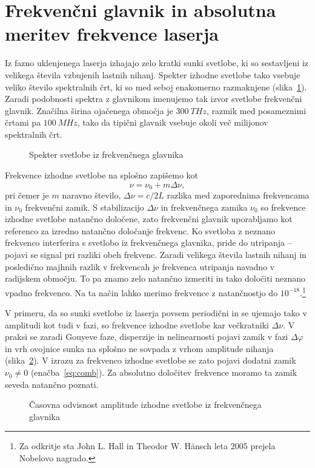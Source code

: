 \section{Frekvenčni glavnik in absolutna meritev frekvence laserja}
Iz fazno uklenjenega laserja izhajajo zelo kratki sunki svetlobe, ki 
so sestavljeni iz velikega števila vzbujenih lastnih nihanj. Spekter 
izhodne svetlobe tako vsebuje veliko število spektralnih črt, ki
so med seboj enakomerno razmaknjene (slika~\ref{fig:comb}). Zaradi podobnosti spektra
z glavnikom imenujemo tak izvor svetlobe frekvenčni glavnik. Značilna širina ojačenega
območja je $300~\si{THz}$, razmik med posameznimi črtami pa $100~\si{MHz}$, tako 
da tipični glavnik vsebuje okoli več milijonov spektralnih črt.
\begin{figure}[h]
\centering
\def\svgwidth{110truemm} 

\caption{Spekter svetlobe iz frekvenčnega glavnika}
\label{fig:comb}
\end{figure}

Frekvence izhodne svetlobe na splošno zapišemo kot 
\begin{equation}
\nu = \nu_0 + m\Delta \nu,
\label{eq:comb}
\end{equation}
pri čemer je $m$ naravno število, $\Delta \nu = c/2L$ razlika med zaporednima 
frekvencama in $\nu_0$ frekvenčni zamik. S stabilizacijo $\Delta \nu$ in 
frekvenčnega zamika $\nu_0$ so frekvence izhodne svetlobe  
natančno določene, zato frekvenčni glavnik uporabljamo kot referenco 
za izredno natančno določanje frekvenc. Ko svetloba z neznano frekvenco
interferira s svetlobo iz frekvenčnega glavnika, pride do utripanja -- pojavi
se signal pri razliki obeh frekvenc. Zaradi velikega števila lastnih nihanj 
in posledično majhnih razlik v frekvencah je frekvenca utripanja navadno v 
radijskem območju. To pa znamo zelo natančno izmeriti in tako določiti neznano 
vpadno frekvenco. Na ta način lahko merimo frekvence z natančnostjo do 
$10^{-18}$.\footnote{Za odkritje 
sta John L. Hall in Theodor W. H\"ansch leta 2005 prejela 
Nobelovo nagrado.} 

V primeru, da so sunki svetlobe iz laserja povsem periodični in se ujemajo tako
v amplitudi kot tudi v fazi, so frekvence izhodne svetlobe kar 
večkratniki $\Delta \nu$. V praksi se zaradi Gouyeve faze,
disperzije in nelinearnosti pojavi zamik
v fazi $\Delta \varphi$ in vrh ovojnice sunka na splošno ne sovpada z vrhom amplitude
nihanja (slika~\ref{fig:comb2}). V izrazu za
frekvenco izhodne svetlobe se zato pojavi dodatni zamik $\nu_0 \neq 0$ (enačba~\ref{eq:comb}). 
Za absolutno
določitev frekvence moramo ta zamik seveda natančno poznati. 
\begin{figure}[h]
\centering
\def\svgwidth{110truemm} 

\caption{Časovna odvisnost amplitude izhodne svetlobe iz frekvenčnega glavnika}
\label{fig:comb2}
\end{figure}

